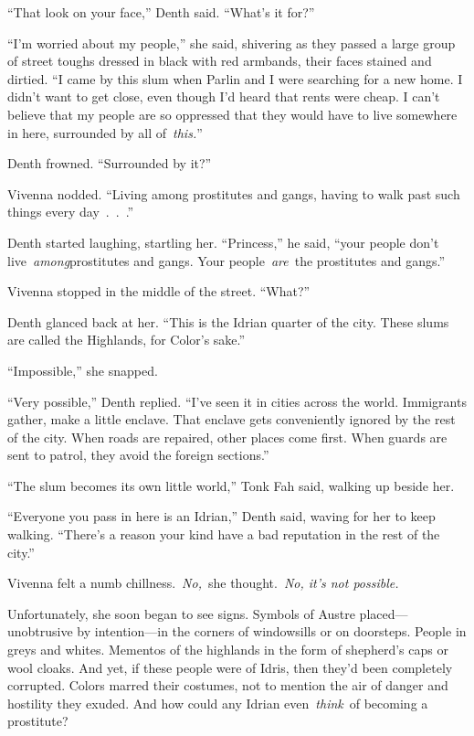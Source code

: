 “That look on your face,” Denth said. “What’s it for?”

“I’m worried about my people,” she said, shivering as they passed a large group of street toughs dressed in black with red armbands, their faces stained and dirtied. “I came by this slum when Parlin and I were searching for a new home. I didn’t want to get close, even though I’d heard that rents were cheap. I can’t believe that my people are so oppressed that they would have to live somewhere in here, surrounded by all of~\textit{this.}”

Denth frowned. “Surrounded by it?”

Vivenna nodded. “Living among prostitutes and gangs, having to walk past such things every day~.~.~.”

Denth started laughing, startling her. “Princess,” he said, “your people don’t live~\textit{among}prostitutes and gangs. Your people~\textit{are}~the prostitutes and gangs.”

Vivenna stopped in the middle of the street. “What?”

Denth glanced back at her. “This is the Idrian quarter of the city. These slums are called the Highlands, for Color’s sake.”

“Impossible,” she snapped.

“Very possible,” Denth replied. “I’ve seen it in cities across the world. Immigrants gather, make a little enclave. That enclave gets conveniently ignored by the rest of the city. When roads are repaired, other places come first. When guards are sent to patrol, they avoid the foreign sections.”

“The slum becomes its own little world,” Tonk Fah said, walking up beside her.

“Everyone you pass in here is an Idrian,” Denth said, waving for her to keep walking. “There’s a reason your kind have a bad reputation in the rest of the city.”

Vivenna felt a numb chillness.~\textit{No,}~she thought.~\textit{No, it’s not possible.}

Unfortunately, she soon began to see signs. Symbols of Austre placed—unobtrusive by intention—in the corners of windowsills or on doorsteps. People in greys and whites. Mementos of the highlands in the form of shepherd’s caps or wool cloaks. And yet, if these people were of Idris, then they’d been completely corrupted. Colors marred their costumes, not to mention the air of danger and hostility they exuded. And how could any Idrian even~\textit{think}~of becoming a prostitute?

